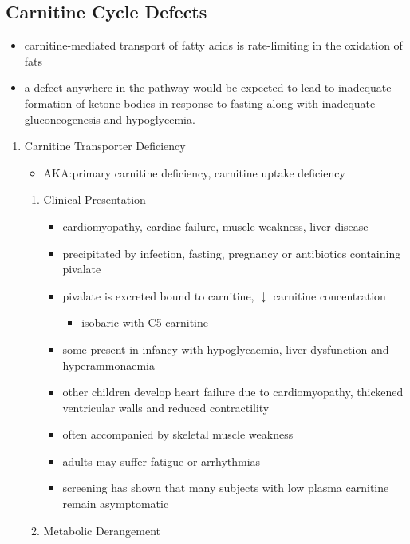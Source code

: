 \documentclass{scrartcl}
\begin{document}
\subsection{Carnitine Cycle Defects}
\label{sec:orgf50a9fe}
\begin{itemize}
\item carnitine-mediated transport of fatty acids is rate-limiting in the
oxidation of fats
\item a defect anywhere in the pathway would be expected to lead to
inadequate formation of ketone bodies in response to fasting along
with inadequate gluconeogenesis and hypoglycemia.
\end{itemize}
\begin{enumerate}
\item Carnitine Transporter Deficiency
\label{sec:org0fdeab8}
\begin{itemize}
\item AKA:primary carnitine deficiency, carnitine uptake deficiency
\end{itemize}
\begin{enumerate}
\item Clinical Presentation
\label{sec:org9579e71}
\begin{itemize}
\item cardiomyopathy, cardiac failure, muscle weakness, liver disease
\item precipitated by infection, fasting, pregnancy or antibiotics containing pivalate
\item pivalate is excreted bound to carnitine, \(\downarrow\) carnitine concentration
\begin{itemize}
\item isobaric with C5-carnitine
\end{itemize}
\item some present in infancy with hypoglycaemia, liver dysfunction and hyperammonaemia
\item other children develop heart failure due to cardiomyopathy,
thickened ventricular walls and reduced contractility
\item often accompanied by skeletal muscle weakness
\item adults may suffer fatigue or arrhythmias
\item screening has shown that many subjects with low plasma carnitine remain asymptomatic
\end{itemize}
\item Metabolic Derangement
\label{sec:orgf1834ea}
\begin{itemize}

\end{itemize}
\end{enumerate}
\end{enumerate}
\end{document}
